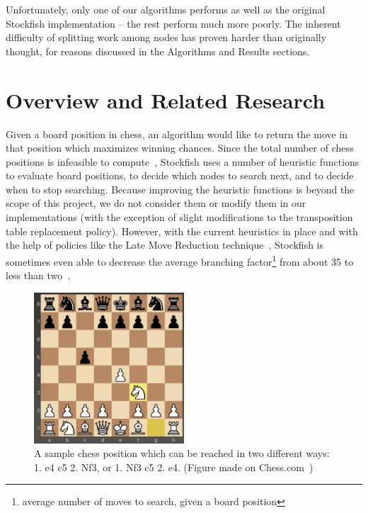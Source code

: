 \documentclass{article}
\begin{document}
Unfortunately, only one of our algorithms performs as well as the original
Stockfish implementation -- the rest perform much more poorly.
The inherent difficulty
of splitting work among nodes has proven harder than originally thought, for
reasons discussed in the Algorithms and Results sections.

\section{Overview and Related Research}\label{Overview}
Given a board position in chess, an algorithm would like to return the move in
that position which maximizes winning chances. Since the total number of chess
positions is infeasible to compute~\cite{chesscom}, Stockfish uses a number of
heuristic functions to evaluate board positions, to decide which nodes to
search next, and to decide when to stop searching.
Because improving the heuristic functions is beyond the scope of this project, we do
not consider them or modify them in our implementations (with the exception of
slight modifications to the transposition table replacement policy).
However, with the current heuristics in place and with the help of policies
like the Late Move Reduction technique~\cite{wiki:LMR},
Stockfish is sometimes even able to decrease the average branching
factor\footnote{average number of moves to search, given a board position} from
about 35 to less than two~\cite{stockfish:code}.

\begin{figure}[t]
	\includegraphics[width=0.5\textwidth]{transposition}
	\caption{A sample chess position which can be reached in two different
	ways: 1. e4 c5 2. Nf3, or 1. Nf3 c5 2. e4. (Figure made on
	Chess.com~\cite{chesscom:fig})}
	\label{fig:transpositions}
\end{figure}
\end{document}
